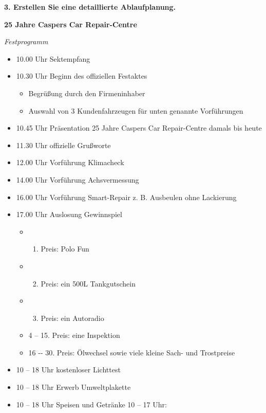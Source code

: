 \newpage

\textbf{3. Erstellen Sie eine detaillierte Ablaufplanung.}

\textbf{25 Jahre Caspers Car Repair-Centre}

\emph{Festprogramm}

\begin{itemize}
\item
  10.00 Uhr Sektempfang
\item
  10.30 Uhr Beginn des offiziellen Festaktes

  \begin{itemize}
  \item
    Begrüßung durch den Firmeninhaber
  \item
    Auswahl von 3 Kundenfahrzeugen für unten genannte Vorführungen
  \end{itemize}
\item
  10.45 Uhr Präsentation 25 Jahre Caspers Car Repair-Centre damals bis
  heute
\item
  11.30 Uhr offizielle Grußworte
\item
  12.00 Uhr Vorführung Klimacheck
\item
  14.00 Uhr Vorführung Achsvermessung
\item
  16.00 Uhr Vorführung Smart-Repair z. B. Ausbeulen ohne Lackierung
\item
  17.00 Uhr Auslosung Gewinnspiel

  \begin{itemize}
  \item
    \begin{enumerate}
    \item
      Preis: Polo Fun
    \end{enumerate}
  \item
    \begin{enumerate}
    \setcounter{enumi}{1}
    \item
      Preis: ein 500L Tankgutschein
    \end{enumerate}
  \item
    \begin{enumerate}
    \setcounter{enumi}{2}
    \item
      Preis: ein Autoradio
    \end{enumerate}
  \item
    4 -- 15. Preis: eine Inspektion
  \item
    16 -\/- 30. Preis: Ölwechsel sowie viele kleine Sach- und
    Trostpreise
  \end{itemize}
\item
  10 -- 18 Uhr kostenloser Lichttest
\item
  10 -- 18 Uhr Erwerb Umweltplakette
\item
  10 -- 18 Uhr Speisen und Getränke 10 -- 17 Uhr:


\end{itemize}
